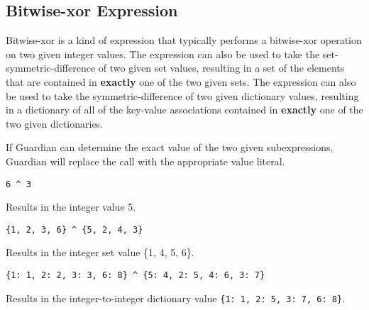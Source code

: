 
\subsection{Bitwise-xor Expression}
{
	Bitwise-xor is a kind of expression that typically performs
	a bitwise-xor operation on two given integer values.
	The expression can also be used to take the set-symmetric-difference
	of two given
	set values, resulting in a set of the elements that are contained in
	\textbf{exactly} one of the two given sets.
	The expression can also be used to take the
	symmetric-difference of two given
	dictionary values, resulting in a dictionary of all of the key-value
	associations contained in \textbf{exactly} one of the two given
	dictionaries.
	
	If Guardian can determine the exact value of the two given subexpressions,
	Guardian will replace the call with the appropriate value literal.
	
	\begin{itemize}
	{
		\item[] \lstinline[language=MAIA, columns=fixed]@6 ^ 3@
		
			Results in the integer value 5.
		
		\item[] \lstinline[language=MAIA, columns=fixed]@{1, 2, 3, 6} ^ {5, 2, 4, 3}@
		
			Results in the integer set value \{1, 4, 5, 6\}.
		
		\item[] \lstinline[language=MAIA, columns=fixed]@{1: 1, 2: 2, 3: 3, 6: 8} ^ {5: 4, 2: 5, 4: 6, 3: 7}@
		
			Results in the integer-to-integer dictionary
			value \lstinline[language=MAIA, columns=fixed]@{1: 1, 2: 5, 3: 7, 6: 8}@.
	}
	\end{itemize}
}
